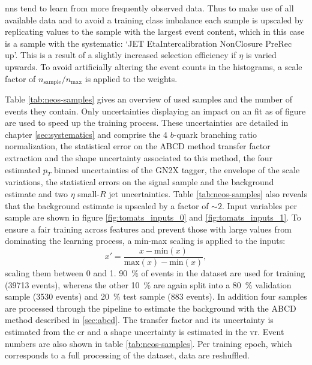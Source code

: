 \acp{nn} tend to learn from more frequently observed data. Thus to make use of all available data and to avoid a training class imbalance each sample is upscaled by replicating values to the sample with the largest event content, which in this case is a sample with the systematic: `JET EtaIntercalibration NonClosure PreRec up'. This is a result of a slightly increased selection efficiency if $\eta$ is varied upwards. To avoid artificially altering the event counts in the histograms, a scale factor of $n_\text{sample}/n_\text{max}$ is applied to the weights.

Table \ref{tab:neos-samples} gives an overview of used samples and the number of events they contain. Only uncertainties displaying an impact on an \mhh{} fit as of figure   are used to speed up the training process. These uncertainties are detailed in chapter \ref{sec:systematics} and comprise the 4 $b$-quark branching ratio normalization, the statistical error on the ABCD method transfer factor extraction and the shape uncertainty associated to this method, the four estimated $p_T$ binned uncertainties of the GN2X tagger, the envelope of the scale variations, the statistical errors on the \ktwov signal sample and the background estimate and two $\eta$ small-$R$ jet uncertainties. Table \ref{tab:neos-samples} also reveals that the background estimate is upscaled by a factor of $\sim 2$. Input variables per sample are shown in figure \ref{fig:tomats_inputs_0} and \ref{fig:tomats_inputs_1}. To ensure a fair training across features and prevent those with large values from dominating the learning process, a min-max scaling is applied to the inputs:
\begin{equation}
    x'=\frac{x - \text{min}(x)}{\text{max}(x)-\text{min}(x)},
\end{equation}
scaling them between 0 and 1. \qty[]{90}{\percent} of events in the dataset are used for training (39713 events), whereas the other \qty[]{10}{\percent} are again split into a \qty[]{80}{\percent} validation sample (3530 events) and \qty[]{20}{\percent} test sample (883 events). In addition four samples are processed through the pipeline to estimate the background with the ABCD method described in \ref{sec:abcd}. The transfer factor and its uncertainty is estimated from the \ac{cr} and a shape uncertainty is estimated in the \ac{vr}. Event numbers are also shown in table \ref{tab:neos-samples}. Per training epoch, which corresponds to a full processing of the dataset, data are reshuffled.

